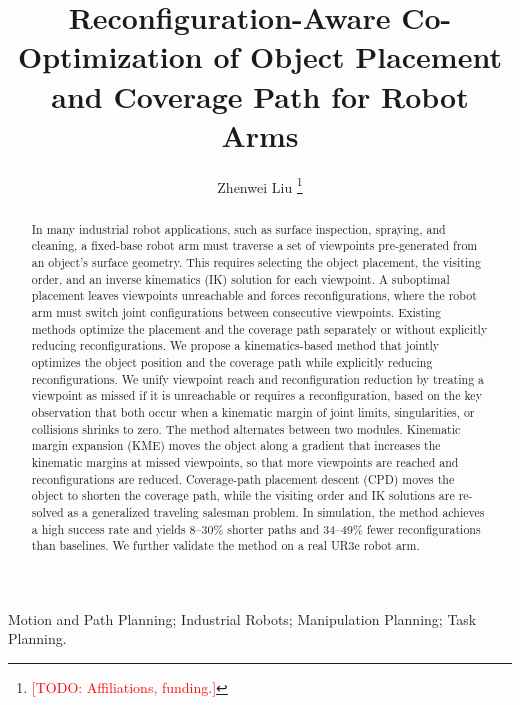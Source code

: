 \documentclass[letterpaper, journal, twoside]{IEEEtran}
\DeclareRobustCommand{\todo}[1]{\textcolor{red}{[TODO: #1]}}  %
\begin{document}
\title{Reconfiguration-Aware Co-Optimization of Object Placement and Coverage Path for Robot Arms}

\author{Zhenwei Liu%
\thanks{\todo{Affiliations, funding.}}}


\maketitle

\begin{abstract}
In many industrial robot applications, such as surface inspection, spraying, and cleaning, a fixed-base robot arm must traverse a set of viewpoints pre-generated from an object's surface geometry. This requires selecting the object placement, the visiting order, and an inverse kinematics (IK) solution for each viewpoint. A suboptimal placement leaves viewpoints unreachable and forces reconfigurations, where the robot arm must switch joint configurations between consecutive viewpoints. Existing methods optimize the placement and the coverage path separately or without explicitly reducing reconfigurations. We propose a kinematics-based method that jointly optimizes the object position and the coverage path while explicitly reducing reconfigurations. We unify viewpoint reach and reconfiguration reduction by treating a viewpoint as missed if it is unreachable or requires a reconfiguration, based on the key observation that both occur when a kinematic margin of joint limits, singularities, or collisions shrinks to zero. The method alternates between two modules. Kinematic margin expansion (KME) moves the object along a gradient that increases the kinematic margins at missed viewpoints, so that more viewpoints are reached and reconfigurations are reduced. Coverage-path placement descent (CPD) moves the object to shorten the coverage path, while the visiting order and IK solutions are re-solved as a generalized traveling salesman problem. In simulation, the method achieves a high success rate and yields 8--30\% shorter paths and 34--49\% fewer reconfigurations than baselines. We further validate the method on a real UR3e robot arm.
\end{abstract}

\begin{IEEEkeywords}
Motion and Path Planning; Industrial Robots; Manipulation Planning; Task Planning.
\end{IEEEkeywords}
\end{document}
